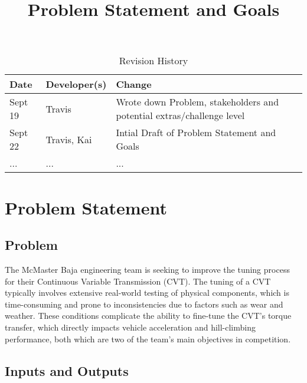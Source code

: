\documentclass{article}
\title{Problem Statement and Goals\\\progname}
\author{\authname}
\date{}
\begin{document}
\maketitle

\begin{table}[hp]
\caption{Revision History} \label{TblRevisionHistory}
\begin{tabularx}{\textwidth}{llX}
\toprule
\textbf{Date} & \textbf{Developer(s)} & \textbf{Change}\\
\midrule
Sept 19 & Travis & Wrote down Problem, stakeholders and potential extras/challenge level\\
Sept 22 & Travis, Kai & Intial Draft of Problem Statement and Goals\\
... & ... & ...\\
\bottomrule
\end{tabularx}
\end{table}

\section{Problem Statement}

\subsection{Problem}
The McMaster Baja engineering team is seeking to improve the tuning process for their Continuous Variable Transmission (CVT). The tuning of a CVT typically involves extensive real-world testing of physical components, which is time-consuming and prone to inconsistencies due to factors such as wear and weather. These conditions complicate the ability to fine-tune the CVT’s torque transfer, which directly impacts vehicle acceleration and hill-climbing performance, both which are two of the team's main objectives in competition.


\subsection{Inputs and Outputs}
\end{document}
